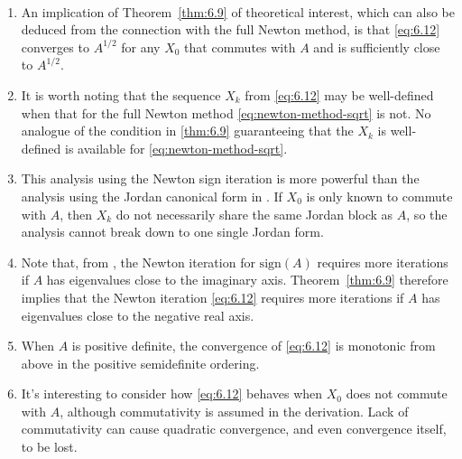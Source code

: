 \documentclass{article}
\newcommand{\sign}{\mathrm{sign}}
\begin{document}
\begin{remark} \  
  \begin{enumerate}
  \item An implication of Theorem~\ref{thm:6.9} of theoretical interest,
    which can also be deduced from the connection with the full Newton
    method, is that \eqref{eq:6.12} converges to $A^{1/2}$ for any $X_0$
    that commutes with $A$ and is sufficiently close to $A^{1/2}$.
  \item 
  It is worth noting that the sequence $X_k$ from \eqref{eq:6.12} may be
  well-defined when that for the full Newton method
  \eqref{eq:newton-method-sqrt} is not. No analogue of the condition in
  \ref{thm:6.9} guaranteeing that the $X_k$ is well-defined is available
  for \eqref{eq:newton-method-sqrt}. 
  \item 
  This analysis using the Newton sign iteration is more powerful than the
  analysis using the Jordan canonical form in
  \cite[Section~4.9.3]{high08_FM}. If $X_0$ is only known to commute with
  $A$, then $X_k$ do not necessarily share the same Jordan block as $A$, so
  the analysis cannot break down to one single Jordan form.
\item 
  Note that, from \cite[Section~5.3]{high08_FM}, the Newton iteration for
  $\sign(A)$ requires more iterations if $A$ has eigenvalues close to the
  imaginary axis. Theorem~\ref{thm:6.9} therefore implies that the Newton
  iteration \eqref{eq:6.12} requires more iterations if $A$ has eigenvalues
  close to the negative real axis. 
\item 
  When $A$ is positive definite, the convergence of \eqref{eq:6.12} is
  monotonic from above in the positive semidefinite ordering.
\item 
  It's interesting to consider how \eqref{eq:6.12} behaves when $X_0$ does
  not commute with $A$, although commutativity is assumed in the
  derivation. Lack of commutativity can cause quadratic convergence, and
  even convergence itself, to be lost. 
  \end{enumerate}
\end{remark}
\end{document}
